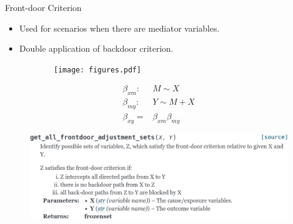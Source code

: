 \documentclass{beamer}
\begin{document}
\begin{frame}{Front-door Criterion}
	\begin{itemize}
		\item Used for scenarios when there are mediator variables.
		\item Double application of backdoor criterion.
	\end{itemize}
	\begin{figure}
		\begin{subfigure}{0.5 \textwidth}
			\centering
			\texttt{[image: figures.pdf]}
		\end{subfigure}%
		\begin{subfigure}{0.5 \textwidth}
			\begin{equation*}
				\begin{split}
					\beta_{xm}:& M \sim X \\
					\beta_{my}:& Y \sim M + X \\
					\beta_{xy} =& \beta_{xm}\beta_{my}
				\end{split}
			\end{equation*}
		\end{subfigure}
	\end{figure}

	\begin{figure}
		\centering
		\includegraphics[scale=0.25]{imgs/frontdoor.png}
	\end{figure}
\end{frame}
\end{document}
